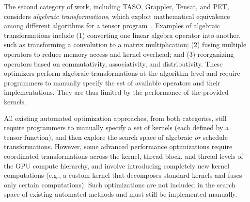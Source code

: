 The second category of work, including TASO, Grappler, Tensat, and PET, considers {\em algebraic transformations}, which exploit mathematical equivalence among different algorithms for a tensor program~\cite{TASO, tensorflow_grappler, yang2021equality, wang2021pet}. 
%
Examples of algebraic transformations include (1) converting one linear algebra operator into another, such as transforming a convolution to a matrix multiplication; (2) fusing multiple operators to reduce memory access and kernel overhead; and (3) reorganizing operators based on commutativity, associativity, and distributivity.
%
These optimizers perform algebraic transformations at the algorithm level and require programmers to manually specify the set of available operators and their implementations.
%
They are thus limited by the performance of the provided kernels.



All existing automated optimization approaches, from both categories, still require programmers to manually specify a set of kernels (each defined by a tensor function), and then explore the search space of algebraic {\em or} schedule transformations.
%
However, some advanced performance optimizations require coordinated transformations across the kernel, thread block, and thread levels of the GPU compute hierarchy, and involve introducing completely new kernel computations (e.g., a custom kernel that decomposes standard kernels and fuses only certain computations).
Such optimizations are not included in the search space of existing automated methods and must still be implemented manually.


